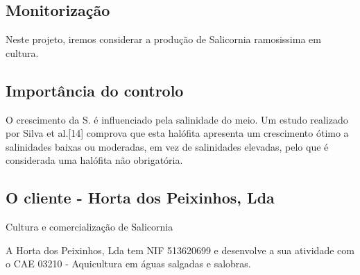 \subsection{Monitorização}




Neste projeto, iremos considerar a produção de Salicornia ramosissima em cultura.



\subsection{Importância do controlo}


O crescimento da S.  é influenciado pela salinidade do meio. Um
estudo realizado por Silva et al.[14] comprova que esta halófita apresenta um crescimento
ótimo a salinidades baixas ou moderadas, em vez de salinidades elevadas, pelo que é
considerada uma halófita não obrigatória.


\subsection{O cliente - Horta dos Peixinhos, Lda}


Cultura e comercialização de Salicornia


A Horta dos Peixinhos, Lda tem NIF 513620699 e desenvolve a sua atividade com o CAE 03210 - Aquicultura em águas salgadas e salobras.











